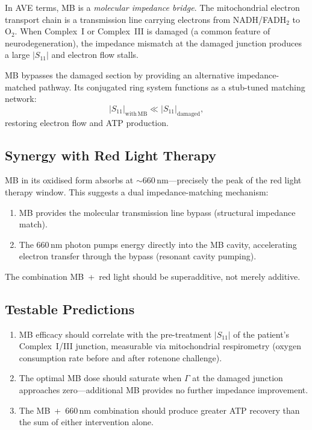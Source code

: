 In AVE terms, MB is a \emph{molecular impedance bridge}.  The
mitochondrial electron transport chain is a transmission line
carrying electrons from NADH/FADH$_2$ to O$_2$.  When Complex~I
or Complex~III is damaged (a common feature of neurodegeneration),
the impedance mismatch at the damaged junction produces a large
$|S_{11}|$ and electron flow stalls.

MB bypasses the damaged section by providing an alternative
impedance-matched pathway.  Its conjugated ring system functions as
a stub-tuned matching network:
\begin{equation}
  |S_{11}|_{\mathrm{with\,MB}} \ll |S_{11}|_{\mathrm{damaged}},
\end{equation}
restoring electron flow and ATP production.

\subsection{Synergy with Red Light Therapy}

MB in its oxidised form absorbs at $\sim$660\,nm---precisely the
peak of the red light therapy window.  This suggests a dual
impedance-matching mechanism:
\begin{enumerate}
  \item MB provides the molecular transmission line bypass
        (structural impedance match).
  \item The 660\,nm photon pumps energy directly into the MB
        cavity, accelerating electron transfer through the bypass
        (resonant cavity pumping).
\end{enumerate}
The combination MB~+~red light should be superadditive, not merely
additive.

\subsection{Testable Predictions}

\begin{enumerate}
  \item MB efficacy should correlate with the pre-treatment
        $|S_{11}|$ of the patient's Complex~I/III junction,
        measurable via mitochondrial respirometry (oxygen
        consumption rate before and after rotenone challenge).
  \item The optimal MB dose should saturate when $\Gamma$ at the
        damaged junction approaches zero---additional MB provides
        no further impedance improvement.
  \item The MB~+~660\,nm combination should produce greater ATP
        recovery than the sum of either intervention alone.
\end{enumerate}


